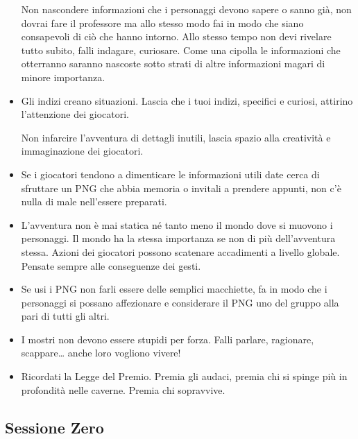\begin{multicols}{2}
\begin{itemize}[leftmargin=*]
Non nascondere informazioni che i personaggi devono sapere o sanno già, non dovrai fare il professore ma allo stesso modo fai in modo che siano consapevoli di ciò che hanno intorno.
Allo stesso tempo non devi rivelare tutto subito, falli indagare, curiosare. Come una cipolla le informazioni che otterranno saranno nascoste sotto strati di altre informazioni magari di minore importanza.

\item
Gli indizi creano situazioni. Lascia che i tuoi indizi, specifici e curiosi, attirino l'attenzione dei giocatori.%

Non infarcire l'avventura di dettagli inutili, lascia spazio alla creatività e immaginazione dei giocatori. %

\item
Se i giocatori tendono a dimenticare le informazioni utili date cerca di sfruttare un PNG che abbia memoria o invitali a prendere appunti, non c'è nulla di male nell'essere preparati.

\item
L'avventura non è mai statica né tanto meno il mondo dove si muovono i personaggi.
Il mondo ha la stessa importanza se non di più dell'avventura stessa. Azioni dei giocatori possono scatenare accadimenti a livello globale. Pensate sempre alle conseguenze dei gesti.

\item
Se usi i PNG non farli essere delle semplici macchiette, fa in modo che i personaggi si possano affezionare e considerare il PNG uno del gruppo alla pari di tutti gli altri.

\item
I mostri non devono essere stupidi per forza. Falli parlare, ragionare, scappare… anche loro vogliono vivere!

\item
Ricordati la Legge del Premio. Premia gli audaci, premia chi si spinge più in profondità nelle caverne. Premia chi sopravvive.

\end{itemize}

\subsection{Sessione Zero}\label{sessionezero}\hypertarget{sessionezero}{}


\end{multicols}
